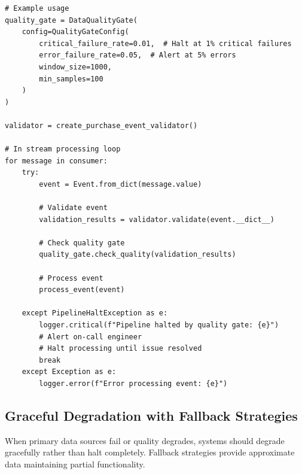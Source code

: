 \begin{lstlisting}[style=python, caption={Data Quality Gate Implementation}]
# Example usage
quality_gate = DataQualityGate(
    config=QualityGateConfig(
        critical_failure_rate=0.01,  # Halt at 1% critical failures
        error_failure_rate=0.05,  # Alert at 5% errors
        window_size=1000,
        min_samples=100
    )
)

validator = create_purchase_event_validator()

# In stream processing loop
for message in consumer:
    try:
        event = Event.from_dict(message.value)

        # Validate event
        validation_results = validator.validate(event.__dict__)

        # Check quality gate
        quality_gate.check_quality(validation_results)

        # Process event
        process_event(event)

    except PipelineHaltException as e:
        logger.critical(f"Pipeline halted by quality gate: {e}")
        # Alert on-call engineer
        # Halt processing until issue resolved
        break
    except Exception as e:
        logger.error(f"Error processing event: {e}")
\end{lstlisting}

\subsection{Graceful Degradation with Fallback Strategies}

When primary data sources fail or quality degrades, systems should degrade gracefully rather than halt completely. Fallback strategies provide approximate data maintaining partial functionality.

